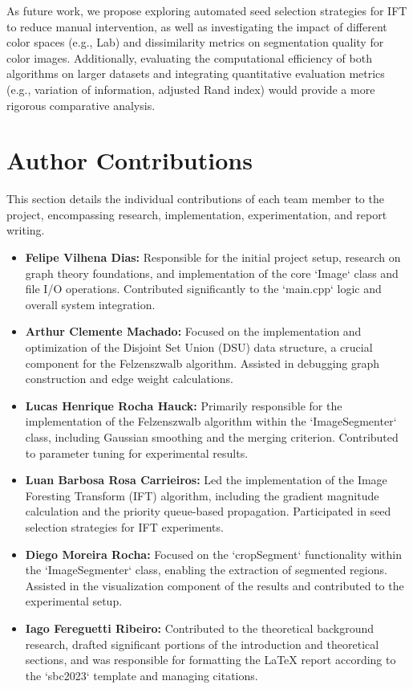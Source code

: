 \documentclass{sbc2023}
\begin{document}
As future work, we propose exploring automated seed selection strategies for IFT to reduce manual intervention, as well as investigating the impact of different color spaces (e.g., L\*a\*b\*) and dissimilarity metrics on segmentation quality for color images. Additionally, evaluating the computational efficiency of both algorithms on larger datasets and integrating quantitative evaluation metrics (e.g., variation of information, adjusted Rand index) would provide a more rigorous comparative analysis.

\section*{Author Contributions}
\label{sec:contributions}
This section details the individual contributions of each team member to the project, encompassing research, implementation, experimentation, and report writing.

\begin{itemize}
    \item \textbf{Felipe Vilhena Dias:} Responsible for the initial project setup, research on graph theory foundations, and implementation of the core `Image` class and file I/O operations. Contributed significantly to the `main.cpp` logic and overall system integration.
    \item \textbf{Arthur Clemente Machado:} Focused on the implementation and optimization of the Disjoint Set Union (DSU) data structure, a crucial component for the Felzenszwalb algorithm. Assisted in debugging graph construction and edge weight calculations.
    \item \textbf{Lucas Henrique Rocha Hauck:} Primarily responsible for the implementation of the Felzenszwalb algorithm within the `ImageSegmenter` class, including Gaussian smoothing and the merging criterion. Contributed to parameter tuning for experimental results.
    \item \textbf{Luan Barbosa Rosa Carrieiros:} Led the implementation of the Image Foresting Transform (IFT) algorithm, including the gradient magnitude calculation and the priority queue-based propagation. Participated in seed selection strategies for IFT experiments.
    \item \textbf{Diego Moreira Rocha:} Focused on the `cropSegment` functionality within the `ImageSegmenter` class, enabling the extraction of segmented regions. Assisted in the visualization component of the results and contributed to the experimental setup.
    \item \textbf{Iago Fereguetti Ribeiro:} Contributed to the theoretical background research, drafted significant portions of the introduction and theoretical sections, and was responsible for formatting the LaTeX report according to the `sbc2023` template and managing citations.
\end{itemize}
\end{document}
